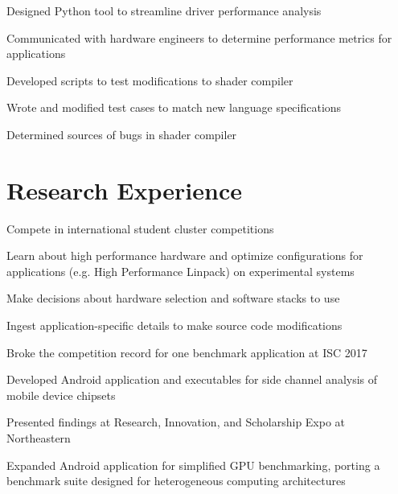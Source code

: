 \documentclass[]{deedy-resume-openfont}
\begin{document}
\vspace{2mm}
\vspace{1mm}
\begin{tightemize}
\item Designed Python tool to streamline driver performance analysis
\item Communicated with hardware engineers to determine performance metrics for applications
\item Developed scripts to test modifications to shader compiler
\item Wrote and modified test cases to match new language specifications
\item Determined sources of bugs in shader compiler
\end{tightemize}

\section{\hfill Research Experience \hfill}

\vspace{0.8mm}
\begin{tightemize}
\item Compete in international student cluster competitions
\item Learn about high performance hardware and optimize configurations for applications (e.g. High Performance Linpack) on experimental systems
\item Make decisions about hardware selection and software stacks to use
\item Ingest application-specific details to make source code modifications
\item Broke the competition record for one benchmark application at ISC 2017
\end{tightemize}

\vspace{2mm}
\vspace{1mm}
\begin{tightemize}
\item Developed Android application and executables for side channel analysis of mobile device chipsets
\item Presented findings at Research, Innovation, and Scholarship Expo at Northeastern
\item Expanded Android application for simplified GPU benchmarking, porting a benchmark suite designed for heterogeneous computing architectures
\end{tightemize}
\end{document}
